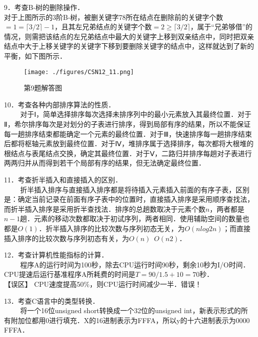 9．考查B-树的删除操作．\\
对于上图所示的3阶B-树，被删关键字78所在结点在删除前的关键字个数$=1= \lceil 3/2 \rceil -1$，且其左兄弟结点的关键字个数$=2 \ge \lceil 3/2 \rceil $，属于“兄弟够借”的情况，则需把该结点的左兄弟结点中最大的关键字上移到双亲结点中，同时把双亲结点中大于上移关键字的关键字下移到要删除关键字的结点中，这样就达到了新的平衡，如下图所示．
\begin{figure}[ht]
\centering
\texttt{[image: ./figures/CSN12\_11.png]}
\caption{第9题解答图} \label{CSN12_fig11}
\end{figure}

10．考查各种内部排序算法的性质．\\
$\qquad$ 对于Ⅰ，简单选择排序每次选择未排序列中的最小元素放入其最终位置．对于Ⅱ，希尔排序每次是对划分的子表进行排序，得到局部有序的结果，所以不能保证每一趟排序结束都能确定一个元素的最终位置．对于Ⅲ，快速排序每一趟排序结束后都将枢轴元素放到最终位置．对于Ⅳ，堆排序属于选择排序，每次都将大根堆的根结点与表尾结点交换，确定其最终位置．对于Ⅴ，二路归并排序每趟对子表进行两两归并从而得到若干个局部有序的结果，但无法确定最终位置．

11．考查折半插入和直接插入的区别．\\
$\qquad$ 折半插入排序与直接插入排序都是将待插入元素插入前面的有序子表，区别是：确定当前记录在前面有序子表中的位置时，直接插入排序是采用顺序查找法，而折半插入排序是采用折半查找法．排序的总趟数取决于元素个数$n$，两者都是$n-1$趟．元素的移动次数都取决于初试序列，两者相同．使用辅助空间的数量也都是$O(1)$．折半插入排序的比较次数与序列初态无关，为$O(nlog2n)$；而直接插入排序的比较次数与序列初态有关，为$O(n)$~$O(n2)$．

12．考查计算机性能指标的计算．\\
$\qquad$ 程序A的运行时间为100秒，除去CPU运行时间90秒，剩余10秒为I/O时间．CPU提速后运行基准程序A所耗费的时间是$T=90/1.5+10=70$秒． \\
【误区】 CPU速度提高50\%，则CPU运行时间减少一半．错误！

13．考查C语言中的类型转换．\\
$\qquad$ 将一个16位unsigned short转换成一个32位的unsigned int，新表示形式的所有附加位都用0进行填充．X的16进制表示为FFFA，所以y的十六进制表示为0000 FFFA．



